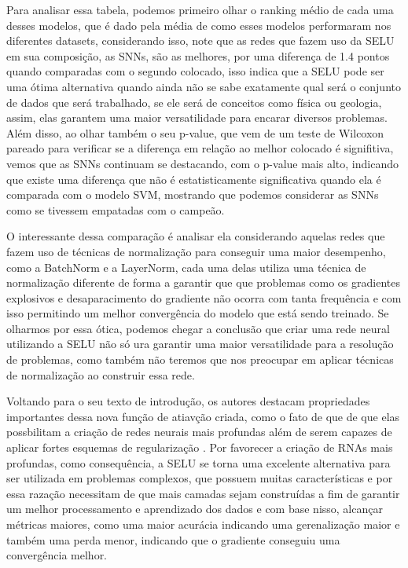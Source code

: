 Para analisar essa tabela, podemos primeiro olhar o ranking médio de cada uma desses modelos, que é dado pela média de como esses modelos performaram nos diferentes datasets, considerando isso, note que as redes que fazem uso da SELU em sua composição, as SNNs, são as melhores, por uma diferença de 1.4 pontos quando comparadas com o segundo colocado, isso indica que a SELU pode ser uma ótima alternativa quando ainda não se sabe exatamente qual será o conjunto de dados que será trabalhado, se ele será de conceitos como física ou geologia, assim, elas garantem uma maior versatilidade para encarar diversos problemas. Além disso, ao olhar também o seu p-value, que vem de um teste de Wilcoxon pareado para verificar se a diferença em relação ao melhor colocado é signifitiva, vemos que as SNNs continuam se destacando, com o p-value mais alto, indicando que existe uma diferença que não é estatisticamente significativa quando ela é comparada com o modelo SVM, mostrando que podemos considerar as SNNs como se tivessem empatadas com o campeão.

O interessante dessa comparação é analisar ela considerando aquelas redes que fazem uso de técnicas de normalização para conseguir uma maior desempenho, como a BatchNorm e a LayerNorm, cada uma delas utiliza uma técnica de normalização diferente de forma a garantir que que problemas como os gradientes explosivos e desaparacimento do gradiente não ocorra com tanta frequência e com isso permitindo um melhor convergência do modelo que está sendo treinado. Se olharmos por essa ótica, podemos chegar a conclusão que criar uma rede neural utilizando a SELU não só ura garantir uma maior versatilidade para a resolução de problemas, como também não teremos que nos preocupar em aplicar técnicas de normalização ao construir essa rede.

Voltando para o seu texto de introdução, os autores destacam propriedades importantes dessa nova função de atiavção criada, como o fato de que de que elas possbilitam a criação de redes neurais mais profundas além de serem capazes de aplicar fortes esquemas de regularização \parencite{SELUArticle}. Por favorecer a criação de RNAs mais profundas, como consequência, a SELU se torna uma excelente alternativa para ser utilizada em problemas complexos, que possuem muitas características e por essa razação necessitam de que mais camadas sejam construídas a fim de garantir um melhor processamento e aprendizado dos dados e com base nisso, alcançar métricas maiores, como uma maior acurácia indicando uma gerenalização maior e também uma perda menor, indicando que o gradiente conseguiu uma convergência melhor.

